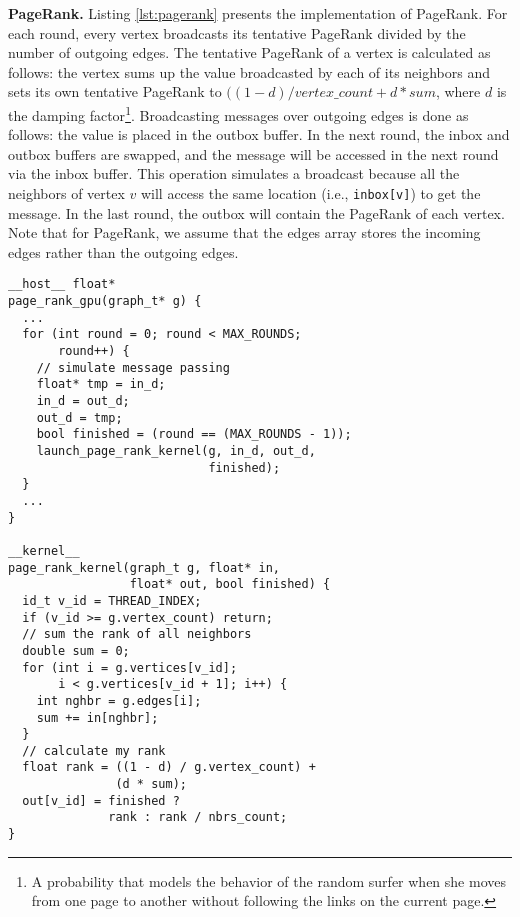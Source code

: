 {\bf PageRank.} Listing \ref{lst:pagerank} presents the implementation of PageRank. For each round, every vertex broadcasts its tentative PageRank divided by the number of outgoing edges. The tentative PageRank of a vertex is calculated as follows: the vertex sums up the value broadcasted by each of its neighbors and sets its own tentative PageRank to $((1 - d) / vertex\_count + d * sum$, where $d$ is the damping factor\footnote{A probability that models the behavior of the random surfer when she moves from one page to another without following the links on the current page.}. Broadcasting messages over outgoing edges is done as follows: the value is placed in the outbox buffer. In the next round, the inbox and outbox buffers are swapped, and the message will be accessed in the next round via the inbox buffer. This operation simulates a broadcast because all the neighbors of vertex $v$ will access the same location (i.e., \texttt{inbox[v]}) to get the message. In the last round, the outbox will contain the PageRank of each vertex. Note that for PageRank, we assume that the edges array stores the incoming edges rather than the outgoing edges.

\begin{lstlisting}[caption=GPU implementation of PageRank,label=lst:pagerank]
__host__ float* 
page_rank_gpu(graph_t* g) {
  ...
  for (int round = 0; round < MAX_ROUNDS;
       round++) {
    // simulate message passing
    float* tmp = in_d;
    in_d = out_d;
    out_d = tmp;
    bool finished = (round == (MAX_ROUNDS - 1));
    launch_page_rank_kernel(g, in_d, out_d,
                            finished);
  }
  ...
}

__kernel__
page_rank_kernel(graph_t g, float* in, 
                 float* out, bool finished) {
  id_t v_id = THREAD_INDEX;
  if (v_id >= g.vertex_count) return;
  // sum the rank of all neighbors
  double sum = 0;
  for (int i = g.vertices[v_id]; 
       i < g.vertices[v_id + 1]; i++) {
    int nghbr = g.edges[i];
    sum += in[nghbr];
  }
  // calculate my rank
  float rank = ((1 - d) / g.vertex_count) +
               (d * sum);
  out[v_id] = finished ?
              rank : rank / nbrs_count;
}
\end{lstlisting}

